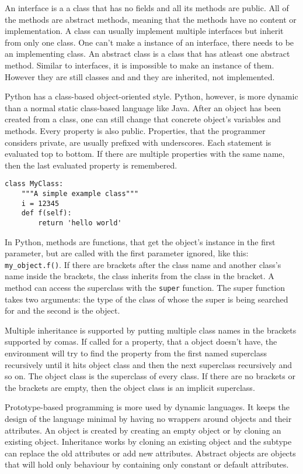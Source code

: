 An interface is a a class that has no fields and all its methods are public. All
of the methods are abstract methods, meaning that the methods have no content or
implementation. A class can usually implement multiple interfaces but inherit
from only one class. One can't make a instance of an interface, there needs to
be an implementing class. An abstract class is a class that has atleast one
abstract method. Similar to interfaces, it is impossible to make an instance of
them. However they are still classes and and they are inherited, not
implemented.

Python has a class-based object-oriented style. Python, however, is more dynamic than a normal static class-based language like Java. After an object has been created from a class, one can still change that concrete object's variables and methods. Every property is also public. Properties, that the programmer considers private, are usually prefixed with underscores. Each statement is evaluated top to bottom. If there are multiple properties with the same name, then the last evaluated property is remembered.
\begin{verbatim}
class MyClass:
    """A simple example class"""
    i = 12345
    def f(self):
        return 'hello world'
\end{verbatim}
In Python, methods are functions, that get the object's instance in the first parameter, but are called with the first parameter ignored, like this: \verb;my_object.f();. If there are brackets after the class name and another class's name inside the brackets, the class inherits from the class in the bracket. A method can access the superclass with the \verb;super; function. The super function takes two arguments: the type of the class of whose the super is being searched for and the second is the object.

Multiple inheritance is supported by putting multiple class names in the
brackets supported by comas. If called for a property, that a object doesn't
have, the environment will try to find the property from the first named
superclass recursively until it hits object class and then the next superclass
recursively and so on. The object class is the superclass of every class. If
there are no brackets or the brackets are empty, then the object class is an
implicit superclass.


Prototype-based programming is more used by dynamic languages. It keeps the
design of the language minimal by having no wrappers around objects and their
attributes. An object is created by creating an empty object or by cloning an
existing object. Inheritance works by cloning an existing object and the subtype
can replace the old attributes or add new attributes. Abstract objects are
objects that will hold only behaviour by containing only constant or default
attributes.
